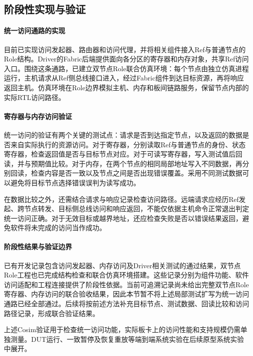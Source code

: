 \subsection{阶段性实现与验证}
\label{sec:midterm-fabric-validation}

\paragraph{统一访问通路的实现}

目前已实现访问发起器、路由器和访问代理，并将相关组件接入Ref与普通节点的Role结构。Driver的Fabric后端提供面向各分区的寄存器和内存对象，共享Ref访问入口。围绕这条通路，已建立双节点Role联合仿真环境：每个节点由独立仿真进程运行，主机请求从Ref侧总线接口进入，经过Fabric组件到达目标资源，再将响应返回主机。仿真环境在Role边界模拟主机、内存和板间链路服务，保留节点内部的实际RTL访问路径。

\paragraph{寄存器与内存访问验证}

统一访问的验证有两个关键的测试点：请求是否到达指定节点，以及返回的数据是否来自实际执行的资源访问。对于寄存器，分别读取Ref与普通节点的身份、状态寄存器，检查返回值是否与目标节点对应。对于可读写寄存器，写入测试值后回读，并与预期值比较。对于内存，在两个节点的相同局部地址写入不同数据，再分别回读，检查内容是否一致以及节点之间是否出现错误覆盖。采用不同测试数据可以避免将目标节点选择错误误判为读写成功。

在数据比较之外，还需结合请求与响应记录检查访问路径。远端请求应经历Ref发起、跨节点转发、目标侧总线访问和响应返回，不能仅依据主机命令正常退出判定统一访问正确。对于无效目标或越界地址，还应检查失败是否以错误结果返回，避免软件将未完成的访问当作成功。

\paragraph{阶段性结果与验证边界}

已有开发记录包含访问发起器、内存访问及Driver相关测试的通过结果，双节点Role工程也已完成结构检查和联合仿真环境搭建。这些记录分别为组件功能、软件访问适配和工程连接提供了阶段性依据。当前可追溯记录尚未给出完整双节点Role寄存器、内存访问的联合验收结果，因此本节暂不将上述局部测试扩写为统一访问通路已经全部通过。后续将按前述方法补充目标节点、测试数据、回读比较和访问路径记录，形成联合验证结果。


上述Cosim验证用于检查统一访问功能，实际板卡上的访问性能和支持规模仍需单独测量。DUT运行、一致暂停及恢复重放等端到端系统实验在后续原型系统实验中展开。
